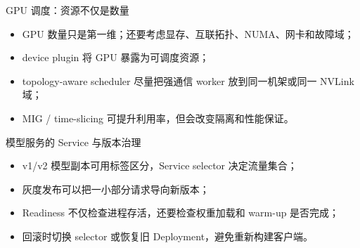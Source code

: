 \documentclass[UTF8,fontset=none,aspectratio=169,10pt]{beamer}
\begin{document}
\begin{frame}{GPU 调度：资源不仅是数量}
\begin{itemize}
  \item GPU 数量只是第一维；还要考虑显存、互联拓扑、NUMA、网卡和故障域；
  \item device plugin 将 GPU 暴露为可调度资源；
  \item topology-aware scheduler 尽量把强通信 worker 放到同一机架或同一 NVLink 域；
  \item MIG / time-slicing 可提升利用率，但会改变隔离和性能保证。
\end{itemize}
\vfill
{}
\end{frame}

\begin{frame}{模型服务的 Service 与版本治理}
\begin{itemize}
  \item v1/v2 模型副本可用标签区分，Service selector 决定流量集合；
  \item 灰度发布可以把一小部分请求导向新版本；
  \item Readiness 不仅检查进程存活，还要检查权重加载和 warm-up 是否完成；
  \item 回滚时切换 selector 或恢复旧 Deployment，避免重新构建客户端。
\end{itemize}
\end{frame}
\end{document}
